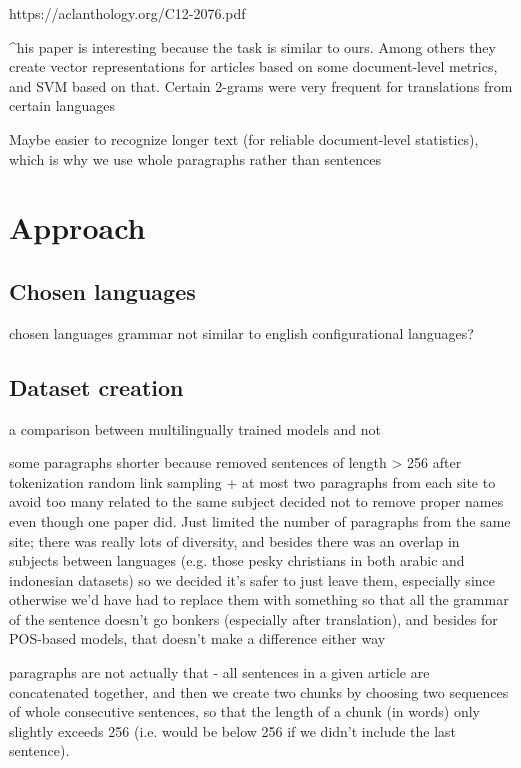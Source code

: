 \documentclass[twocolumn]{article}
\begin{document}
https://aclanthology.org/C12-2076.pdf

^his paper is interesting because the task is similar to ours. Among others they create vector representations for articles based on some document-level metrics, and SVM based on that. Certain 2-grams were very frequent for translations from certain languages

Maybe easier to recognize longer text (for reliable document-level statistics), which is why we use whole paragraphs rather than sentences




\section*{Approach}

\subsection*{Chosen languages}

chosen languages
grammar not similar to english
configurational languages?

\subsection*{Dataset creation}

a comparison between multilingually trained models and not

some paragraphs shorter because removed sentences of length > 256 after tokenization
random link sampling + at most two paragraphs from each site to avoid too many related to the same subject
decided not to remove proper names even though one paper did. Just limited the number of paragraphs from the same site; there was really lots of diversity, and besides there was an overlap in subjects between languages (e.g. those pesky christians in both arabic and indonesian datasets) so we decided it's safer to just leave them, especially since otherwise we'd have had to replace them with something so that all the grammar of the sentence doesn't go bonkers (especially after translation), and besides for POS-based models, that doesn't make a difference either way

paragraphs are not actually that - all sentences in a given article are concatenated together, and then we create two chunks by choosing two sequences of whole consecutive sentences, so that the length of a chunk (in words) only slightly exceeds 256 (i.e. would be below 256 if we didn't include the last sentence).
\end{document}
